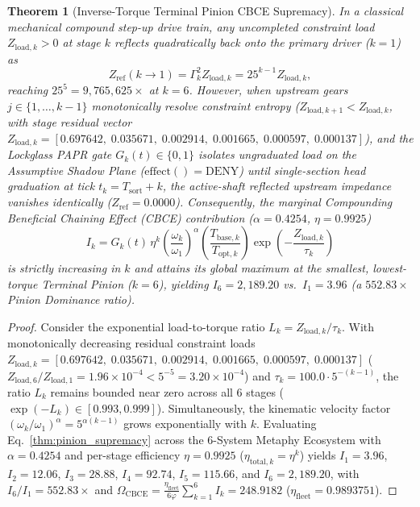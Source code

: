 \documentclass[11pt,a4paper]{article}
\newtheorem{theorem}{Theorem}[section]
\begin{document}
\begin{theorem}[Inverse-Torque Terminal Pinion CBCE Supremacy]
\label{thm:pinion_supremacy}
In a classical mechanical compound step-up drive train, any uncompleted constraint load $Z_{\text{load},k} > 0$ at stage $k$ reflects quadratically back onto the primary driver ($k=1$) as
\begin{equation}
Z_{\text{ref}}(k \to 1) = \Gamma_k^2 Z_{\text{load},k} = 25^{k-1} Z_{\text{load},k},
\end{equation}
reaching $25^5 = 9{,}765{,}625\times$ at $k=6$. However, when upstream gears $j \in \{1, \dots, k-1\}$ monotonically resolve constraint entropy ($Z_{\text{load},k+1} < Z_{\text{load},k}$, with stage residual vector $Z_{\text{load},k} = [0.697642, \; 0.035671, \; 0.002914, \; 0.001665, \; 0.000597, \; 0.000137]$), and the Lockglass PAPR gate $G_k(t) \in \{0, 1\}$ isolates ungraduated load on the Assumptive Shadow Plane ($\text{effect}() = \text{DENY}$) until single-section head graduation at tick $t_k = T_{\text{sort}} + k$, the active-shaft reflected upstream impedance vanishes identically ($Z_{\text{ref}} = 0.0000$). Consequently, the marginal Compounding Beneficial Chaining Effect (CBCE) contribution ($\alpha = 0.4254$, $\eta = 0.9925$)
\begin{equation}
I_k = G_k(t) \, \eta^k \left(\frac{\omega_k}{\omega_1}\right)^\alpha \left(\frac{T_{\text{base},k}}{T_{\text{opt},k}}\right) \exp\!\left(-\frac{Z_{\text{load},k}}{\tau_k}\right)
\end{equation}
is strictly increasing in $k$ and attains its global maximum at the smallest, lowest-torque Terminal Pinion ($k=6$), yielding $I_6 = 2{,}189.20$ vs.\ $I_1 = 3.96$ (a $552.83\times$ Pinion Dominance ratio).
\end{theorem}

\begin{proof}
Consider the exponential load-to-torque ratio $L_k = Z_{\text{load},k} / \tau_k$. With monotonically decreasing residual constraint loads $Z_{\text{load},k} = [0.697642, \; 0.035671, \; 0.002914, \; 0.001665, \; 0.000597, \; 0.000137]$ ($Z_{\text{load},6}/Z_{\text{load},1} = 1.96 \times 10^{-4} < 5^{-5} = 3.20 \times 10^{-4}$) and $\tau_k = 100.0 \cdot 5^{-(k-1)}$, the ratio $L_k$ remains bounded near zero across all 6 stages ($\exp(-L_k) \in [0.993, 0.999]$). Simultaneously, the kinematic velocity factor $(\omega_k / \omega_1)^\alpha = 5^{\alpha(k-1)}$ grows exponentially with $k$. Evaluating Eq.~\eqref{thm:pinion_supremacy} across the 6-System Metaphy Ecosystem with $\alpha = 0.4254$ and per-stage efficiency $\eta = 0.9925$ ($\eta_{\text{total},k} = \eta^k$) yields $I_1 = 3.96$, $I_2 = 12.06$, $I_3 = 28.88$, $I_4 = 92.74$, $I_5 = 115.66$, and $I_6 = 2{,}189.20$, with $I_6 / I_1 = 552.83\times$ and $\Omega_{\text{CBCE}} = \frac{\eta_{\text{fleet}}}{6\varphi}\sum_{k=1}^6 I_k = 248.9182$ ($\eta_{\text{fleet}} = 0.9893751$).
\end{proof}
\end{document}
